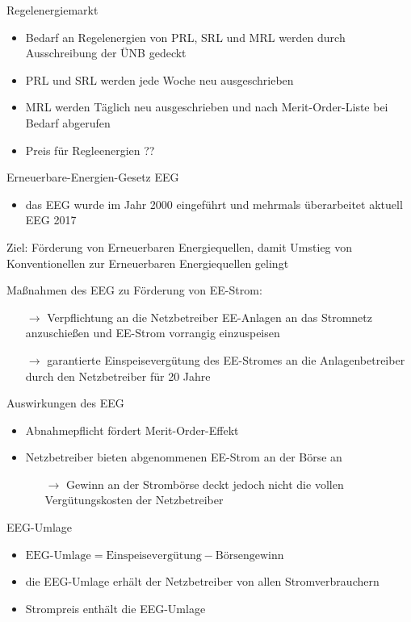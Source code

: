 \documentclass[aspectratio=1610, professionalfonts, 9pt]{beamer}
\begin{document}
\begin{frame}{Regelenergiemarkt}
\begin{itemize}
  \item Bedarf an Regelenergien von PRL, SRL und MRL werden durch Ausschreibung
der ÜNB gedeckt
\item PRL und SRL werden jede Woche neu ausgeschrieben
\item MRL werden Täglich neu ausgeschrieben und nach Merit-Order-Liste bei Bedarf abgerufen
\item Preis für Regleenergien ??
\end{itemize}
\end{frame}


\begin{frame}{Erneuerbare-Energien-Gesetz EEG}
   \begin{itemize}
     \item das EEG wurde im Jahr 2000 eingeführt und mehrmals überarbeitet aktuell EEG 2017
   \end{itemize}
\pause
    \begin{block}{Ziel:}
      Förderung von Erneuerbaren Energiequellen, damit Umstieg von Konventionellen zur Erneuerbaren Energiequellen gelingt
    \end{block}
\pause
    \begin{block}{Maßnahmen des EEG zu Förderung von EE-Strom:}
     \begin{itemize}
       \item[$\rightarrow$] Verpflichtung an die Netzbetreiber EE-Anlagen an das Stromnetz anzuschießen und EE-Strom vorrangig einzuspeisen
       \item[$\rightarrow$] garantierte Einspeisevergütung des EE-Stromes an die Anlagenbetreiber durch den Netzbetreiber für 20 Jahre
   \end{itemize}
   \end{block}
\end{frame}

\begin{frame}{Auswirkungen des EEG}
  \begin{itemize}
    \item Abnahmepflicht fördert Merit-Order-Effekt
    \item Netzbetreiber bieten abgenommenen EE-Strom an der Börse an
\begin{itemize}
  \item[$\rightarrow$] Gewinn an der Strombörse deckt jedoch nicht die vollen Vergütungskosten der Netzbetreiber
\end{itemize}
\end{itemize}
\begin{block}{EEG-Umlage}
\begin{itemize}
  \item $\text{EEG-Umlage}=\text{Einspeisevergütung}-\text{Börsengewinn}$
\item die EEG-Umlage erhält der Netzbetreiber von allen Stromverbrauchern
\item Strompreis enthält die EEG-Umlage
\end{itemize}
\end{block}
\end{frame}
\end{document}
